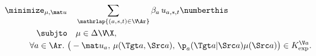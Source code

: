 \begin{align*}
    \minimize_{\mu, \mat u} &\quad
        \sum_{\mathrlap{(a,s,t) \in \V\!\Ar}} \beta_a \, u_{a,s,t}
    \numberthis\label{prob:joint-inc}\\
    \subjto&\quad \mu \in \Delta\V\!\X, \\[-0.4ex]
        \forall a \in \Ar.~&\big(-{\mat u}_a,\, \mu( \Tgt a,\Src a),\, \p_a(\Tgt a | \Src a)  \mu(\Src a) \big) \in K_{\exp}^{\V a}
        .
\end{align*}
